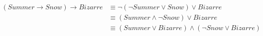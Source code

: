 \documentclass[preview,border=4pt]{standalone}
\begin{document}
\[
\begin{aligned}
    (Summer \rightarrow Snow) \rightarrow Bizarre
      &\equiv \neg(\neg Summer \lor Snow) \lor Bizarre\\
      &\equiv (Summer \land \neg Snow) \lor Bizarre\\
      &\equiv (Summer \lor Bizarre) \land (\neg Snow \lor Bizarre)
  \end{aligned}
\]
\end{document}
